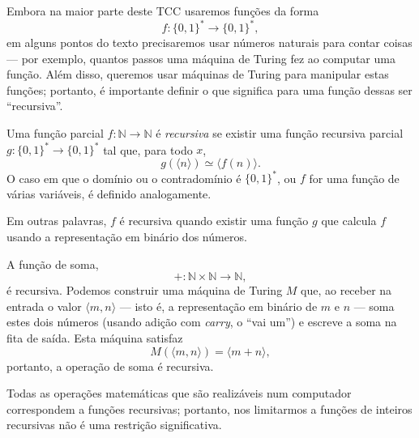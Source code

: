 Embora na maior parte deste TCC usaremos funções da forma
\begin{equation*}
    f : \{0, 1\}^* \to \{0, 1\}^*,
\end{equation*}
em alguns pontos do texto precisaremos usar números naturais para contar coisas
--- por exemplo,
quantos passos uma máquina de Turing fez ao computar uma função.
Além disso,
queremos usar máquinas de Turing para manipular estas funções;
portanto,
é importante definir o que significa para uma função dessas ser ``recursiva''.

\begin{definition}
    Uma função parcial $f: \mathbb N \to \mathbb N$ é \emph{recursiva}
    se existir uma função recursiva parcial $g: \{0, 1\}^* \to \{0, 1\}^*$
    tal que, para todo $x$,
    \begin{equation*}
        g(\langle n \rangle) \simeq \langle f(n) \rangle.
    \end{equation*}
    O caso em que o domínio ou o contradomínio é $\{0, 1\}^*$,
    ou $f$ for uma função de várias variáveis,
    é definido analogamente.
\end{definition}

Em outras palavras,
$f$ é recursiva quando existir uma função $g$
que calcula $f$ usando a representação em binário dos números.

\begin{example}
    A função de soma,
    \begin{equation*}
        +: \mathbb N \times \mathbb N \to \mathbb N,
    \end{equation*}
    é recursiva.
    Podemos construir uma máquina de Turing $M$ que,
    ao receber na entrada o valor $\langle m, n \rangle$
    --- isto é, a representação em binário de $m$ e $n$ ---
    soma estes dois números
    (usando adição com \emph{carry}, o ``vai um'')
    e escreve a soma na fita de saída.
    Esta máquina satisfaz
    \begin{equation*}
        M(\langle m, n \rangle) = \langle m+n \rangle,
    \end{equation*}
    portanto, a operação de soma é recursiva.
\end{example}

Todas as operações matemáticas que são realizáveis num computador
correspondem a funções recursivas;
portanto,
nos limitarmos a funções de inteiros recursivas não é uma restrição significativa.
